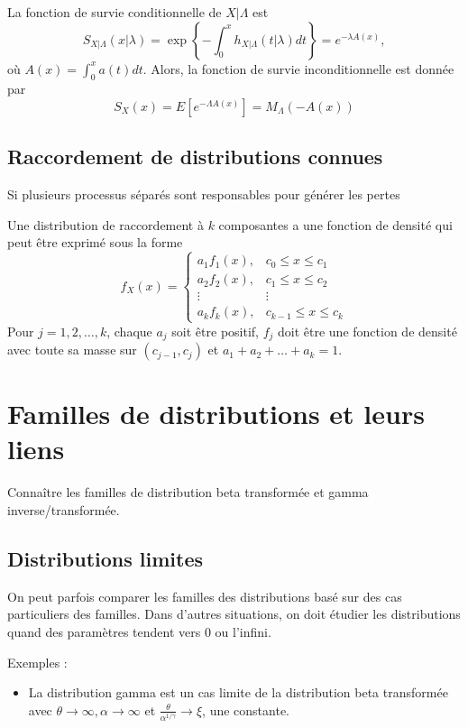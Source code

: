 La fonction de survie conditionnelle de $X\vert \Lambda$ est 
$$S_{X\vert\Lambda}(x\vert\lambda) = \exp\left\{-\int_{0}^{x}h_{X\vert\Lambda}(t\vert\lambda)dt\right\} = e^{-\lambda A(x)},$$
où $A(x) = \int_{0}^{x}a(t) dt$. Alors, la fonction de survie inconditionnelle est donnée par 
$$S_{X}(x) = E\left[e^{-\Lambda A(x)}\right] = M_{\Lambda}(-A(x))$$

\subsection{Raccordement de distributions connues}

Si plusieurs processus séparés sont responsables pour générer les pertes

\begin{definition}{}{}
	Une distribution de raccordement à $k$ composantes a une fonction de densité qui peut être exprimé sous la forme
	$$f_{X}(x) = \begin{cases}
	a_1 f_{1}(x), & c_0 \leq x \leq c_1\\
	a_2 f_{2}(x), & c_1 \leq x \leq c_2\\
	\vdots & \vdots\\
	a_k f_{k}(x), & c_{k-1} \leq x \leq c_k
	\end{cases}$$
	Pour $j = 1, 2, \dots, k$, chaque $a_j$ soit être positif, $f_{j}$ doit être une fonction de densité avec toute sa masse sur $(c_{j-1}, c_j)$ et $a_1 + a_2 + \dots + a_k = 1$.
\end{definition}

\section{Familles de distributions et leurs liens}

Connaître les familles de distribution beta transformée et gamma inverse/transformée.

\subsection{Distributions limites}

On peut parfois comparer les familles des distributions basé sur des cas particuliers des familles. Dans d'autres situations, on doit étudier les distributions quand des paramètres tendent vers 0 ou l'infini.

Exemples : 

\begin{itemize}
	\item La distribution gamma est un cas limite de la distribution beta transformée avec $\theta \to \infty, \alpha \to \infty$ et $\frac{\theta}{\alpha^{1/\gamma}} \to \xi$, une constante. 
\end{itemize}



